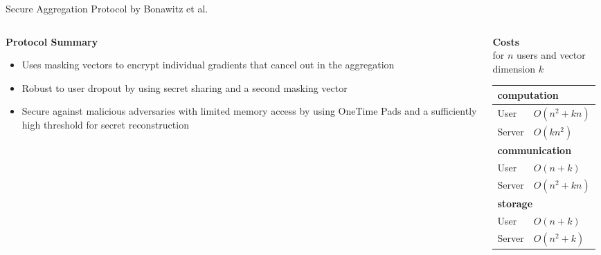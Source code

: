\documentclass[t,aspectratio=169]{beamer}
\newcommand{\numUsers}{n}
\newcommand{\numElements}{k}
\begin{document}
\begin{frame}{Secure Aggregation Protocol by Bonawitz et al. \cite{bonawitz2016practicalsecureaggregationfederated}}
\begin{columns}[T]
    
    \begin{column}{0.5 \textwidth}
        \textbf{Protocol Summary}
        \begin{itemize}
            \item Uses masking vectors to encrypt individual gradients that cancel out in the aggregation
            \item Robust to user dropout by using secret sharing and a second masking vector
            \item Secure against malicious adversaries with limited memory access by using OneTime Pads and a sufficiently high threshold for secret reconstruction
        \end{itemize}
    \end{column}
    \begin{column}{0.5\textwidth}
        \textbf{Costs} \\ for $n$ users and vector dimension $k$

          \begin{tabular}{ll}
            \\
            \hline
            \multicolumn{2}{l}{\textbf{computation}} \\
            \hline 
            User & $O(\numUsers^2 + \numElements\numUsers)$ \\
            Server & $O(\numElements\numUsers^2)$\\
            \hline
            \multicolumn{2}{l}{\textbf{communication}} \\
            \hline
            User & $O(\numUsers + \numElements)$ \\
            Server & $O(\numUsers^2 + \numElements\numUsers)$ \\
            \hline
            \multicolumn{2}{l}{\textbf{storage}} \\
            \hline
            User & $O(\numUsers + \numElements)$ \\
            Server & $O(\numUsers^2 + \numElements)$ \\
            
            \end{tabular}
            \label{table:costs}
    \end{column}
\end{columns}
\end{frame}
\end{document}
